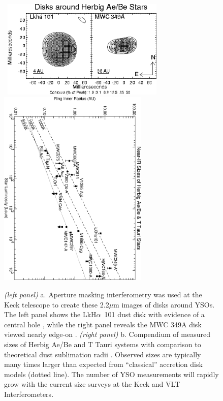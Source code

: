 \documentclass[12pt]{article}
\begin{document}
\begin{figure}[tbhp]
\begin{center}
\mbox{
\includegraphics[clip,angle=0.,width=3.05in]{Figures/JDM_twostars.eps}}
\includegraphics[clip,angle=90,width=2.8in]{Figures/JDM_fig_sizes.eps}
\caption{\footnotesize {\em (left panel)}
  a.  Aperture masking interferometry was used at the Keck telescope
  to create these 2.2$\mu$m images of disks around YSOs.  The left
  panel shows the LkH$\alpha$~101 dust disk with evidence of a central
  hole \citep{tuthill2001a}, while the right panel reveals the MWC
  349A disk viewed nearly edge-on \citep{danchi2001}.  {\em (right
    panel)} b. Compendium of measured sizes of Herbig Ae/Be and T
  Tauri systems with comparison to theoretical dust sublimation radii
  \citep[from Figure~1 of][reproduced with permission of the
  AAS]{monnier2002a}.  Observed sizes are typically many times larger
  than expected from ``classical'' accretion disk models (dotted
  line).  The number of YSO measurements will rapidly grow with the
  current size surveys at the Keck and VLT Interferometers.
\label{herbigfig}}
\end{center}
\end{figure}
\end{document}
